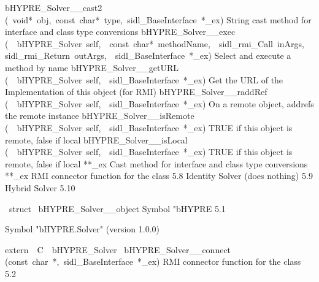 \documentclass{article}
\begin{document}
\begin{cxxentry}
\begin{cxxnames}
        {}
\label{cxx.5.13}
        {bHYPRE\_Solver\_\_cast2}
        {(\ void*\ obj,\ const\ char*\ type,\ sidl\_BaseInterface\ *\_ex)}
        {
String cast method for interface and class type conversions}
        {}
\label{cxx.5.14}
        {bHYPRE\_Solver\_\_exec}
        {(\ \ bHYPRE\_Solver\ self,\ \ const\ char*\ methodName,\ \ sidl\_rmi\_Call\ inArgs,\ \ sidl\_rmi\_Return\ outArgs,\ \ sidl\_BaseInterface\ *\_ex)}
        {
Select and execute a method by name}
        {}
\label{cxx.5.15}
        {bHYPRE\_Solver\_\_getURL}
        {(\ \ bHYPRE\_Solver\ self,\ \ sidl\_BaseInterface\ *\_ex)}
        {
Get the URL of the Implementation of this object (for RMI)}
        {}
\label{cxx.5.16}
        {bHYPRE\_Solver\_\_raddRef}
        {(\ \ bHYPRE\_Solver\ self,\ \ sidl\_BaseInterface\ *\_ex)}
        {
On a remote object, addrefs the remote instance}
        {}
\label{cxx.5.17}
        {bHYPRE\_Solver\_\_isRemote}
        {(\ \ bHYPRE\_Solver\ self,\ \ sidl\_BaseInterface\ *\_ex)}
        {
TRUE if this object is remote, false if local}
        {}
\label{cxx.5.18}
        {bHYPRE\_Solver\_\_isLocal}
        {(\ \ bHYPRE\_Solver\ self,\ \ sidl\_BaseInterface\ *\_ex)}
        {
TRUE if this object is remote, false if local}
        {}
\label{cxx.5.19}
        {**\_ex}
        {}
        {
Cast method for interface and class type conversions}
        {}
\label{cxx.5.20}
        {**\_ex}
        {}
        {
RMI connector function for the class}
        {5.8}
\cxxitem{}
        {Identity Solver (does nothing)}
        {}
        {
}
        {5.9}
\cxxitem{}
        {Hybrid Solver}
        {}
        {
}
        {5.10}
\end{cxxnames}
\begin{cxxvariable}
{\ struct\ }
        {bHYPRE\_Solver\_\_object}
        {}
        {
Symbol "bHYPRE}
        {5.1}
\begin{cxxdoc}

Symbol "bHYPRE.Solver" (version 1.0.0)
\end{cxxdoc}
\end{cxxvariable}
\begin{cxxfunction}
{extern\ \ C\ \ bHYPRE\_Solver\ }
        {bHYPRE\_Solver\_\_connect}
        {(const\ char\ *,\ sidl\_BaseInterface\ *\_ex)}
        {
RMI connector function for the class}
        {5.2}
\begin{cxxdoc}


\end{cxxdoc}
\end{cxxfunction}
\end{cxxentry}
\end{document}
